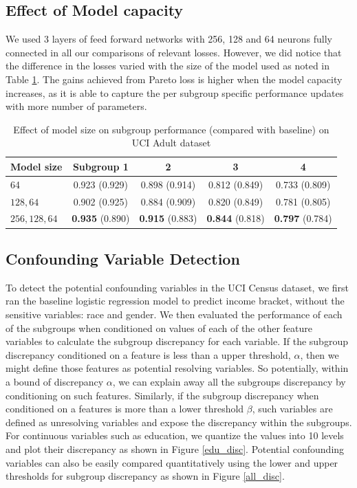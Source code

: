 \subsection{Effect of Model capacity}
We used 3 layers of feed forward networks with 256, 128 and 64 neurons fully connected in all our comparisons of relevant losses. However, we did notice that the difference in the losses varied with the size of the model used as noted in Table \ref{tab:uci_model_size}. The gains achieved from Pareto loss is higher when the model capacity increases, as it is able to capture the per subgroup specific performance updates with more number of parameters.

\begin{table}[tp]
\footnotesize
\caption{Effect of model size on subgroup performance (compared with baseline) on UCI Adult dataset}
\begin{center}
\begin{tabular}{lcccc}
\hline
\textbf{Model size} & \textbf{Subgroup 1} & \textbf{2} & \textbf{3} & \textbf{4}\\\hline
64 & 0.923 (0.929) & 0.898 (0.914) & 0.812 (0.849) & 0.733 (0.809)\\
$128,64$ & 0.902 (0.925) & 0.884 (0.909) & 0.820 (0.849) & 0.781 (0.805)\\
$256,128,64$ & \textbf{0.935} (0.890) & \textbf{0.915} (0.883) & \textbf{0.844} (0.818) & \textbf{0.797} (0.784)\\\hline
\end{tabular}
\end{center}
\label{tab:uci_model_size}
\normalsize
\end{table}%


\subsection{Confounding Variable Detection}
To detect the potential confounding variables in the UCI Census dataset, we first ran the baseline logistic regression model to predict income bracket, without the sensitive variables: race and gender. We then evaluated the performance of each of the subgroups when conditioned on values of each of the other feature variables to calculate the subgroup discrepancy for each variable. If the subgroup discrepancy conditioned on a feature is less than a upper threshold,  $\alpha$, then we might define those features as potential resolving variables. So potentially, within a bound of discrepancy  $\alpha$, we can explain away all the subgroups discrepancy by conditioning on such features. Similarly, if the subgroup discrepancy when conditioned on a features is more than a lower threshold $\beta$, such variables are defined as unresolving variables and expose the discrepancy within the subgroups. For continuous variables such as education, we quantize the values into 10 levels and plot their discrepancy as shown in Figure \ref{edu_disc}. Potential confounding variables can also be easily compared quantitatively using the lower and upper thresholds for subgroup discrepancy as shown in Figure \ref{all_disc}.

